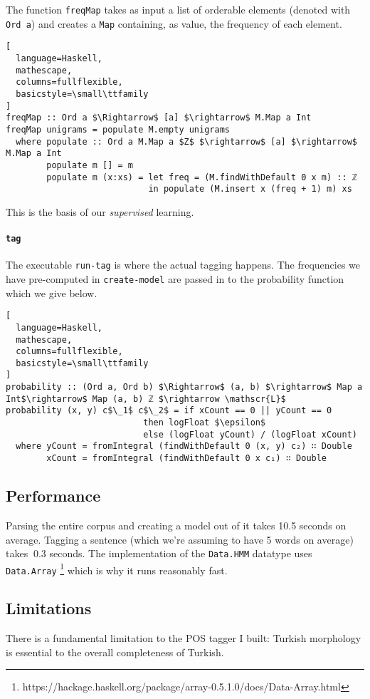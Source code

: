 \documentclass{article}
\begin{document}
The function \texttt{freqMap} takes as input a list of orderable elements
(denoted with \texttt{Ord a}) and creates a \texttt{Map} containing, as value,
the frequency of each element.

\begin{lstlisting}[
  language=Haskell,
  mathescape,
  columns=fullflexible,
  basicstyle=\small\ttfamily
]
freqMap :: Ord a $\Rightarrow$ [a] $\rightarrow$ M.Map a Int
freqMap unigrams = populate M.empty unigrams
  where populate :: Ord a M.Map a $Z$ $\rightarrow$ [a] $\rightarrow$ M.Map a Int
        populate m [] = m
        populate m (x:xs) = let freq = (M.findWithDefault 0 x m) :: ℤ
                            in populate (M.insert x (freq + 1) m) xs
\end{lstlisting}

This is the basis of our \emph{supervised} learning.

\paragraph{\texttt{tag}}

The executable \texttt{run-tag} is where the actual tagging happens. The
frequencies we have pre-computed in \texttt{create-model} are passed in to the
probability function which we give below.
\begin{lstlisting}[
  language=Haskell,
  mathescape,
  columns=fullflexible,
  basicstyle=\small\ttfamily
]
probability :: (Ord a, Ord b) $\Rightarrow$ (a, b) $\rightarrow$ Map a Int$\rightarrow$ Map (a, b) ℤ $\rightarrow \mathscr{L}$
probability (x, y) c$\_1$ c$\_2$ = if xCount == 0 || yCount == 0
                           then logFloat $\epsilon$
                           else (logFloat yCount) / (logFloat xCount)
  where yCount = fromIntegral (findWithDefault 0 (x, y) c₂) ∷ Double
        xCount = fromIntegral (findWithDefault 0 x c₁) ∷ Double
\end{lstlisting}
\subsection{Performance}
Parsing the entire corpus and creating a model out of it takes 10.5 seconds on
average. Tagging a sentence (which we're assuming to have 5 words on average)
takes $~0.3$ seconds. The implementation of the \texttt{Data.HMM} datatype uses
\texttt{Data.Array}
\footnote{https://hackage.haskell.org/package/array-0.5.1.0/docs/Data-Array.html}
which is why it runs reasonably fast.

\subsection{Limitations}
There is a fundamental limitation to the POS tagger I built: Turkish morphology
is essential to the overall completeness of Turkish.
\end{document}
